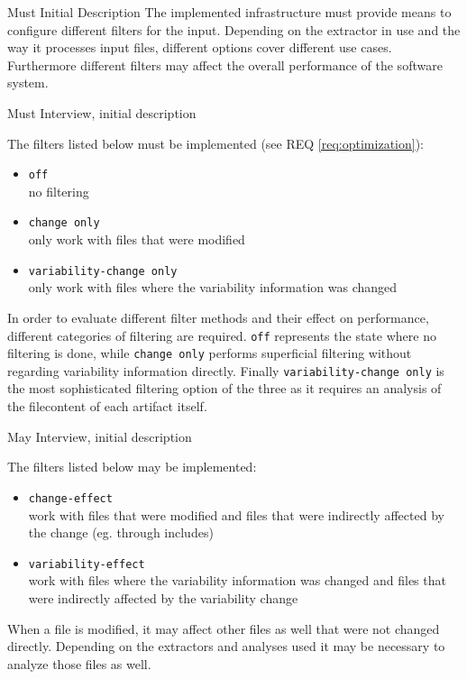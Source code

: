 \documentclass[a4paper]{article}
\begin{document}
\clearpage
\begin{req} \label{req:optimization}
\reqtable
	{Must}  {Initial Description}
	{
	The implemented infrastructure must provide means to configure different filters for the input.
    }
	{Depending on the extractor in use and the way it processes input files, different options cover different use cases. Furthermore different filters may affect the overall performance of the software system.}

\begin{subreq}\label{req:mandatory-filters}
    \reqtable
	{Must}  {Interview, initial description}
	{
	The filters listed below must be implemented (see REQ \ref{req:optimization}):
	\begin{itemize}
		\item \texttt{off} \\
		no filtering 
	    \item \texttt{change only} \\
	    only work with files that were modified
	    \item \texttt{variability-change only} \\
	     only work with files where the variability information was changed
	\end{itemize}
    }
	{In order to evaluate different filter methods and their effect on performance, different categories of filtering are required. \texttt{off} represents the state where no filtering is done, while \texttt{change only} performs superficial filtering without regarding variability information directly. Finally \texttt{variability-change only} is the most sophisticated filtering option of the three as it requires an analysis of the filecontent of each artifact itself.}
\end{subreq}

\begin{subreq}
    \reqtable
	{May}  {Interview, initial description}
	{
	The filters listed below may be implemented:
	\begin{itemize}
		\item \texttt{change-effect} \\
		work with files that were modified and files that were indirectly affected by the change (eg. through includes)
	    \item \texttt{variability-effect}  \\
	    work with files where the variability information was changed and files that were indirectly affected by the variability change
	\end{itemize}
    }
	{When a file is modified, it may affect other files as well that were not changed directly. Depending on the extractors and analyses used it may be necessary to analyze those files as well.}
\end{subreq}

\end{req}
\end{document}

